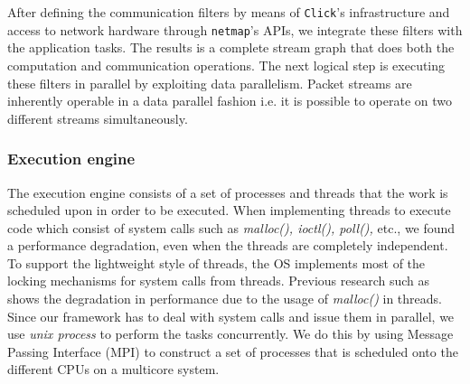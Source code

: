 \documentclass[10pt, conference, compsocconf, reqno]{IEEEtran}
\newcommand{\comment}[1]{}
\begin{document}
After defining the communication filters by means of \texttt{Click}'s infrastructure and access to network hardware through \texttt{netmap}'s APIs, we integrate these filters with the application tasks. The results is a complete stream graph that does both the computation and communication operations. The next logical step is executing these filters in parallel by exploiting data parallelism. Packet streams are inherently operable in a data parallel fashion i.e. it is possible to operate on two different streams simultaneously. \comment{Since the application tasks depend on the data packets, they could also be executed in parallel. So from the integrated graph constructed by combining the application and packet processing operations, it becomes possible to extract data parallelism by operating on different data streams simultaneously. By executing different components, representing distinct operations on the data streams, it is also possible to exploit task parallelism.}

\subsubsection{Execution engine}
\label{ppe}

The execution engine consists of a set of processes and threads that the work is scheduled upon in order to be executed. When implementing threads to execute code which consist of system calls such as \textit{malloc(), ioctl(), poll(),} etc., we found a performance degradation, even when the threads are completely independent. To support the lightweight style of threads, the OS implements most of the locking mechanisms for system calls from threads. Previous research such as \cite{Lever:2000:MPM:1267724.1267780} \cite{Dice:2002:MLM:773039.512451} \cite{Michael:2004:SLD:996893.996848} shows the degradation in performance due to the usage of \textit{malloc()} in threads. Since our framework has to deal with system calls and issue them in parallel, we use \textit{unix process} to perform the tasks concurrently. We do this by using Message Passing Interface (MPI) \cite{TheMPIForum:1993:MMP:169627.169855} to construct a set of processes that is scheduled onto the different CPUs on a multicore system.
\end{document}
